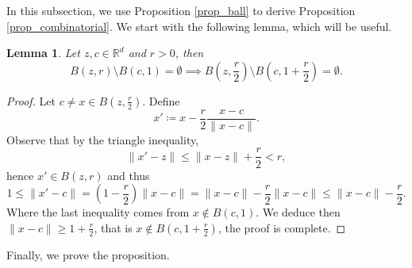 \documentclass[a4paper, 11pt]{article}
\theoremstyle{plain}
\newtheorem{Lemma}[Theorem]{Lemma}
\theoremstyle{definition}
\newcommand{\R}{\mathbb{R}}
\numberwithin{equation}{section}
\begin{document}
In this subsection, we use Proposition \ref{prop_ball} to derive Proposition \ref{prop_combinatorial}. We start with the following lemma, which will be useful.

\begin{Lemma}
    \label{lemma_shrink}
    Let $z, c\in\R^d$ and $r>0$, then
        \[B(z, r)\setminus B(c, 1)=\emptyset\implies B\left(z, \frac{r}{2}\right)\setminus B\left(c, 1+\frac{r}{2}\right)=\emptyset.\]
\end{Lemma}

\begin{proof}
    Let $c\neq x\in B(z, \frac{r}{2})$. Define
        \[x'\coloneqq x-\frac{r}{2}\frac{x-c}{\|x-c\|}.\]
    Observe that by the triangle inequality,
        \[\|x'-z\|\leq \|x-z\|+\frac{r}{2}<r,\]
    hence $x'\in B(z, r)$ and thus
        \[1\leq\|x'-c\|=\left(1-\frac{r}{2}\right)\|x-c\|=\|x-c\|-\frac{r}{2}\|x-c\|\leq\|x-c\|-\frac{r}{2}.\]
    Where the last inequality comes from $x\notin B(c,1)$. We deduce then $\|x-c\|\geq1+\frac{r}{2}$, that is $x\notin B(c,1+\frac{r}{2})$, the proof is complete.
\end{proof}


Finally, we prove the proposition.
\end{document}
